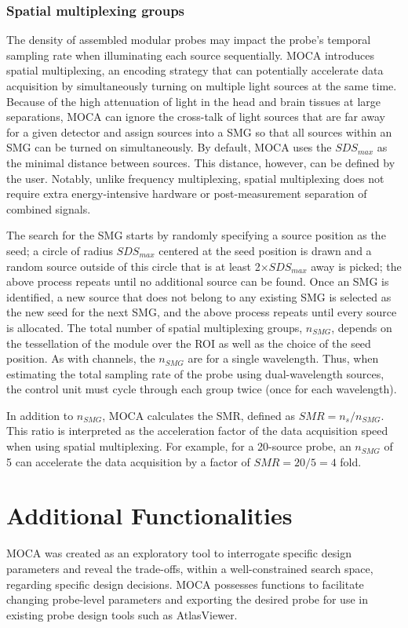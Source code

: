 \subsubsection{Spatial multiplexing groups}
The density of assembled modular probes may impact the probe's temporal sampling rate when illuminating each source sequentially. \ac{MOCA} introduces spatial multiplexing, an encoding strategy that can potentially accelerate data acquisition by simultaneously turning on multiple light sources at the same time. Because of the high attenuation of light in the head and brain tissues at large separations, \ac{MOCA} can ignore the cross-talk of light sources that are far away for a given detector and assign sources into a \ac{SMG} so that all sources within an \ac{SMG} can be turned on simultaneously. By default, \ac{MOCA} uses the $SDS_{max}$ as the minimal distance between sources. This distance, however, can be defined by the user. Notably, unlike frequency multiplexing, spatial multiplexing does not require extra energy-intensive hardware or post-measurement separation of combined signals. 

The search for the \ac{SMG} starts by randomly specifying a source position as the seed; a circle of radius $SDS_{max}$ centered at the seed position is drawn and a random source outside of this circle that is at least 2$\times SDS_{max}$ away is picked; the above process repeats until no additional source can be found. Once an \ac{SMG} is identified, a new source that does not belong to any existing \ac{SMG} is selected as the new seed for the next \ac{SMG}, and the above process repeats until every source is allocated. The total number of spatial multiplexing groups, $n_{SMG}$, depends on the tessellation of the module over the \ac{ROI} as well as the choice of the seed position. As with channels, the $n_{SMG}$ are for a single wavelength. Thus, when estimating the total sampling rate of the probe using dual-wavelength sources, the control unit must cycle through each group twice (once for each wavelength).

In addition to $n_{SMG}$, \ac{MOCA} calculates the \ac{SMR}, defined as $SMR=n_s/n_{SMG}$. This ratio is interpreted as the acceleration factor of the data acquisition speed when using spatial multiplexing. For example, for a 20-source probe, an $n_{SMG}$ of 5 can accelerate the data acquisition by a factor of $SMR=20/5=4$ fold.



\section{Additional Functionalities}
\label{sec:features}
\ac{MOCA} was created as an exploratory tool to interrogate specific design parameters and reveal the trade-offs, within a well-constrained search space, regarding specific design decisions. \ac{MOCA} possesses functions to facilitate changing probe-level parameters and exporting the desired probe for use in existing probe design tools such as AtlasViewer.

